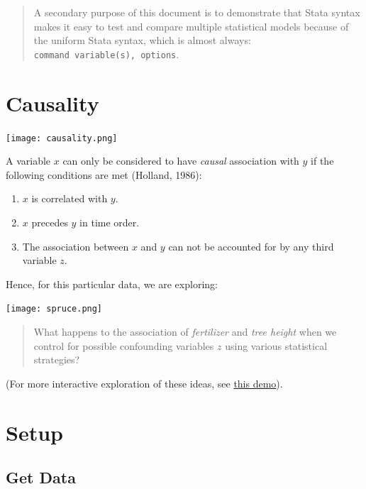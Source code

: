 \documentclass[
]{article}
\providecommand{\tightlist}{%
  \setlength{\itemsep}{0pt}\setlength{\parskip}{0pt}}
\begin{document}
\begin{quote}
A secondary purpose of this document is to demonstrate that Stata syntax
makes it easy to test and compare multiple statistical models because of
the uniform Stata syntax, which is almost always:
\texttt{command\ variable(s),\ options}.
\end{quote}

\hypertarget{causality}{%
\section{Causality 🌲}\label{causality}}

\texttt{[image: causality.png]}

A variable \(x\) can only be considered to have \emph{causal}
association with \(y\) if the following conditions are met (Holland,
1986):

\begin{enumerate}
\def\labelenumi{\arabic{enumi}.}
\tightlist
\item
  \(x\) is correlated with \(y\).
\item
  \(x\) precedes \(y\) in time order.
\item
  The association between \(x\) and \(y\) can not be accounted for by
  any third variable \(z\).
\end{enumerate}

Hence, for this particular data, we are exploring:

\texttt{[image: spruce.png]}

\begin{quote}
What happens to the association of \emph{fertilizer} and \emph{tree
height} when we control for possible confounding variables \(z\) using
various statistical strategies?
\end{quote}

(For more interactive exploration of these ideas, see
\href{https://agrogan.shinyapps.io/causality/?_inputs_\&sidebarCollapsed=false\&y=\%22tree\%20height\%22\&sidebarItemExpanded=null\&x=\%22fertilizer\%22\&z=\%22alternative\%20explanation\%22}{this
demo}).

\hypertarget{setup}{%
\section{Setup 🌲}\label{setup}}

\hypertarget{get-data}{%
\subsection{Get Data}\label{get-data}}
\end{document}
